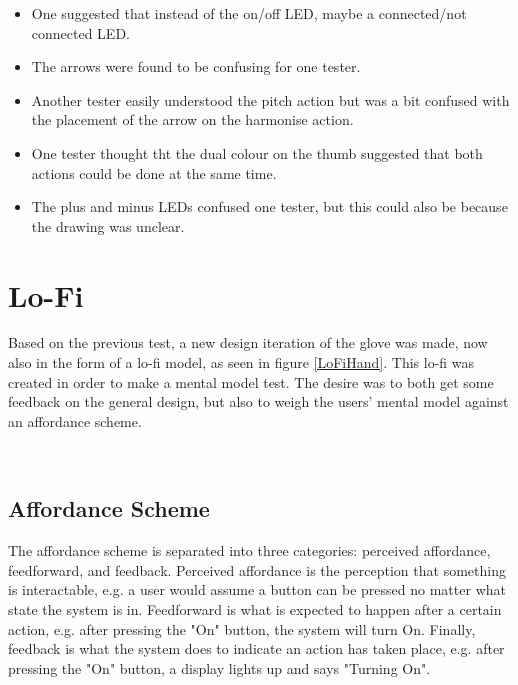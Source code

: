 \begin{itemize}
	\item One suggested that instead of the on/off LED, maybe a connected/not connected LED.
	\item The arrows were found to be confusing for one tester.
	\item Another tester easily understood the pitch action but was a bit confused with the placement of the arrow on the harmonise action.
	\item One tester thought tht the dual colour on the thumb suggested that both actions could be done at the same time.
	\item The plus and minus LEDs confused one tester, but this could also be because the drawing was unclear.
\end{itemize} 

\section{Lo-Fi}

Based on the previous test, a new design iteration of the glove was made, now also in the form of a lo-fi model, as seen in figure \ref{LoFiHand}. This lo-fi was created in order to make a mental model test. The desire was to both get some feedback on the general design, but also to weigh the users' mental model against an affordance scheme.\\

\begin{minipage}{\linewidth}%
\label{LoFiHand}
\end{minipage}\\

\subsection{Affordance Scheme}
The affordance scheme is separated into three categories: perceived affordance, feedforward, and feedback\citep{Affordance}. Perceived affordance is the perception that something is interactable, e.g. a user would assume a button can be pressed no matter what state the system is in. Feedforward is what is expected to happen after a certain action, e.g. after pressing the "On" button, the system will turn On. Finally, feedback is what the system does to indicate an action has taken place, e.g. after pressing the "On" button, a display lights up and says "Turning On".


